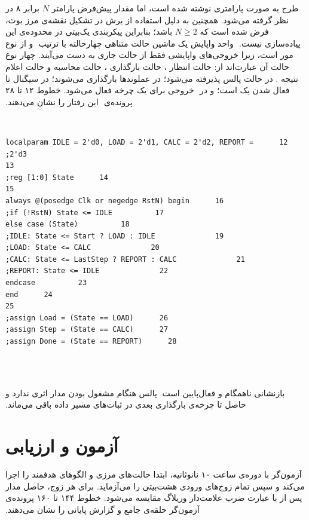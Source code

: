 ‫
‫طرح به صورت پارامتری نوشته شده است، اما مقدار پیش‌فرض پارامتر $N$ برابر ۸ در نظر گرفته
‫می‌شود. همچنین به دلیل استفاده از برش  در تشکیل نقشه‌ی مرز بوث،
‫فرض شده است که $N\geq 2$ باشد؛ بنابراین پیکربندی یک‌بیتی در محدوده‌ی این پیاده‌سازی نیست.
‫
‫واحد واپایش یک ماشین حالت متناهی چهارحالته با ترتیب
‫
‫و از نوع مور است، زیرا خروجی‌های واپایشی فقط از حالت جاری به دست می‌آیند. چهار نوع حالت آن
‫عبارت‌اند از: حالت انتظار ، حالت بارگذاری ، حالت محاسبه  و
‫حالت اعلام نتیجه . در حالت  پالس  پذیرفته می‌شود؛ در  عملوندها بارگذاری
‫می‌شوند؛ در  سیگنال  تا فعال شدن  یک است؛ و در
‫ خروجی  برای یک چرخه فعال می‌شود. خطوط ۱۲ تا ۲۸ پرونده‌ی
‫ این رفتار را نشان می‌دهند.
‫
‫\begin{dsdlcodeblock}
‫\begin{verbatim}
‫12      localparam IDLE = 2'd0, LOAD = 2'd1, CALC = 2'd2, REPORT = 2'd3;
‫13
‫14      reg [1:0] State;
‫15
‫16      always @(posedge Clk or negedge RstN) begin
‫17          if (!RstN) State <= IDLE;
‫18          else case (State)
‫19              IDLE: State <= Start ? LOAD : IDLE;
‫20              LOAD: State <= CALC;
‫21              CALC: State <= LastStep ? REPORT : CALC;
‫22              REPORT: State <= IDLE;
‫23          endcase
‫24      end
‫25
‫26      assign Load = (State == LOAD);
‫27      assign Step = (State == CALC);
‫28      assign Done = (State == REPORT);
‫\end{verbatim}
‫\end{dsdlcodeblock}
‫
‫بازنشانی  ناهمگام و فعال‌پایین است. پالس  هنگام مشغول بودن مدار اثری
‫ندارد و حاصل تا چرخه‌ی بارگذاری بعدی در ثبات‌های مسیر داده باقی می‌ماند.
‫
‫
‫\section{آزمون و ارزیابی}
‫
‫آزمون‌گر  با دوره‌ی ساعت ۱۰ نانوثانیه، ابتدا حالت‌های مرزی و
‫الگوهای هدفمند را اجرا می‌کند و سپس تمام زوج‌های ورودی هشت‌بیتی را می‌آزماید. برای هر زوج،
‫حاصل مدار پس از  با عبارت ضرب علامت‌دار وریلاگ مقایسه می‌شود. خطوط ۱۴۴ تا ۱۶۰
‫پرونده‌ی آزمون‌گر حلقه‌ی جامع و گزارش پایانی را نشان می‌دهند.
‫
